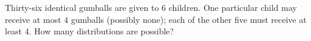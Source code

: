 Thirty-six identical gumballs are given to $6$ children. One particular child may receive at most $4$ gumballs (possibly none); each of the other five must receive at least $4$. How many distributions are possible?
